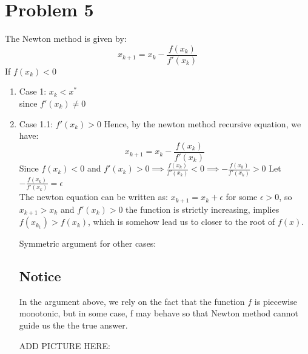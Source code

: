 \documentclass[11pt]{article}
\newcommand{\1}{\mathbbm{1}}
\begin{document}
\section*{Problem 5}
The Newton method is given by:
$$x_{k+1} = x_k -\frac{f(x_k)}{f'(x_k)}$$
If $f(x_k) < 0$\\
\begin{enumerate}

\item Case 1: $ x_k < x^* $\\
since $f'(x_k) \neq 0 $
\item Case 1.1: $f'(x_k) > 0 $
Hence, by the newton method recursive equation, we have:
$$x_{k+1} = x_k -\frac{f(x_k)}{f'(x_k)}$$
Since $f(x_k) <0$ and $f'(x_k) > 0 \implies \frac{f(x_k)}{f'(x_k)} < 0 \implies -\frac{f(x_k)}{f'(x_k)}>0$
Let $-\frac{f(x_k)}{f'(x_k)} = \epsilon$\\
The newton equation can be written as:
$x_{k+1} = x_k + \epsilon$ for some $\epsilon >0$, so $x_{k+1}>x_k$ and $f'(x_k) > 0$ the function is strictly increasing, implies $f(x_{k_1}) > f(x_k)$, which is somehow lead us to closer to the root of $f(x)$.

Symmetric argument for other cases:

\subsection{Notice}
In the argument above, we rely on the fact that the function $f$ is piecewise monotonic, but in some case, f may behave so that Newton method cannot guide us the the true answer.

ADD PICTURE HERE:




\end{enumerate}
\end{document}
